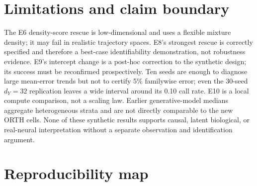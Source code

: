 \documentclass[10.5pt]{article}
\begin{document}
\section{Limitations and claim boundary}

The E6 density-score rescue is low-dimensional and uses a flexible mixture density; it may fail in realistic trajectory spaces.  E8's strongest rescue is correctly specified and therefore a best-case identifiability demonstration, not robustness evidence.  E9's intercept change is a post-hoc correction to the synthetic design; its success must be reconfirmed prospectively.  Ten seeds are enough to diagnose large mean-error trends but not to certify 5\% familywise error; even the 30-seed $d_Y=32$ replication leaves a wide interval around its 0.10 call rate.  E10 is a local compute comparison, not a scaling law.  Earlier generative-model medians aggregate heterogeneous strata and are not directly comparable to the new ORTH cells.  None of these synthetic results supports causal, latent biological, or real-neural interpretation without a separate observation and identification argument.

\section{Reproducibility map}
\end{document}
